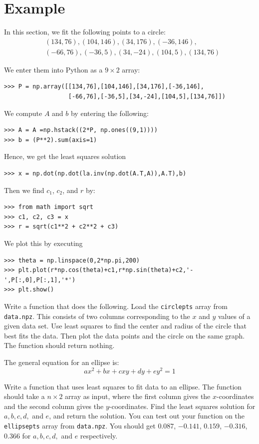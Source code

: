 \section*{Example}

In this section, we fit the following points to a circle:
\begin{align*}
&(134,76),(104,146),(34,176),(-36,146),\\
&(-66,76),(-36,5),(34,-24),(104,5),(134,76)
\end{align*}

We enter them into Python as a $9\times 2$ array:
\begin{lstlisting}
>>> P = np.array([[134,76],[104,146],[34,176],[-36,146],
                  [-66,76],[-36,5],[34,-24],[104,5],[134,76]])
\end{lstlisting}
We compute $A$ and $b$ by entering the following:
\begin{lstlisting}
>>> A = A =np.hstack((2*P, np.ones((9,1))))
>>> b = (P**2).sum(axis=1)
\end{lstlisting}
Hence, we get the least squares solution
\begin{lstlisting}
>>> x = np.dot(np.dot(la.inv(np.dot(A.T,A)),A.T),b)
\end{lstlisting}
Then we find $c_1$, $c_2$, and $r$ by:
\begin{lstlisting}
>>> from math import sqrt
>>> c1, c2, c3 = x
>>> r = sqrt(c1**2 + c2**2 + c3)
\end{lstlisting}
We plot this by executing
\begin{lstlisting}
>>> theta = np.linspace(0,2*np.pi,200)
>>> plt.plot(r*np.cos(theta)+c1,r*np.sin(theta)+c2,'-',P[:,0],P[:,1],'*')
>>> plt.show()
\end{lstlisting}


\begin{problem}
Write a function  that does the following.
Load the \texttt{circlepts} array from \texttt{data.npz}.
This consists of two columns corresponding to the $x$ and $y$ values of a given
data set.  Use least squares to find the center and radius of the circle that best
fits the data.  Then plot the data points and the circle on the same graph.
The function should return nothing.
\end{problem}

\begin{problem}
The general equation for an ellipse is:
\[
ax^2 + bx + cxy + dy + ey^2 = 1
\]

Write a function  that uses least squares to fit data to an ellipse.
The function should take a $n\times 2$ array as input, where the first column gives the $x$-coordinates
and the second column gives the $y$-coordinates. Find the least squares solution for $a, b, c, d,$ and $e$,
and return the solution.
You can test out your function on the \texttt{ellipsepts} array from \texttt{data.npz}. You should get  $0.087$, $-0.141$,  $0.159$, $-0.316$, $0.366$ for $a, b, c, d,$ and $e$ respectively.
\end{problem}

